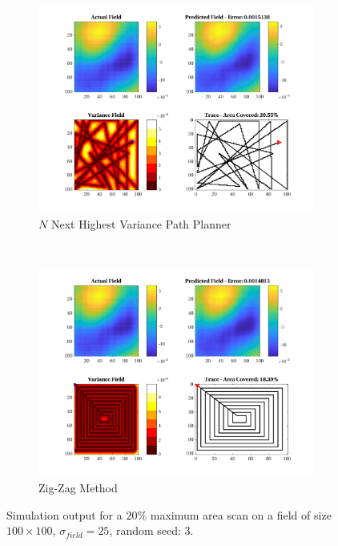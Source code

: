 \begin{figure}[htb!]
\begin{subfigure}[t]{0.5\textwidth}
    \end{subfigure}%
    \\
    \begin{subfigure}[t]{0.5\textwidth}
        \centering
        \includegraphics[width=\linewidth]{figures/hbresults/nnhv_20p_100x100_sf_25_seed_3.png}
        \captionsetup{skip=0.10\baselineskip,size=footnotesize}
        \caption{$N$ Next Highest Variance Path Planner}
    \end{subfigure}%
    ~
    \begin{subfigure}[t]{0.5\textwidth}
        \centering
        \includegraphics[width=\linewidth]{figures/hbresults/zz_20p_100x100_sf_25_seed_3.png}
        \captionsetup{skip=0.10\baselineskip,size=footnotesize}
        \caption{Zig-Zag Method}
    \end{subfigure}%
    \captionsetup{skip=0.20\baselineskip}
    \caption{Simulation output for a $20\%$ maximum area scan on a field of size $100 \times 100$, $\sigma_{field} = 25$, random seed: 3.}
    \label{fig:sim_sigma25_p20_s3}
\end{figure}

